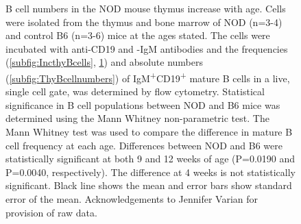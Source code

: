 \begin{figure}
\begin{subfigure}{0.5\textwidth}
	\label{subfig:BMBcells}
	\end{subfigure}
\caption[B cell numbers in the NOD mouse thymus increase with age]{B cell numbers in the NOD mouse thymus increase with age. 
Cells were isolated from the thymus and bone marrow of NOD (n=3-4) and control B6 (n=3-6) mice at the ages stated. The cells were incubated with anti-CD19 and -IgM antibodies and the frequencies (\ref{subfig:IncthyBcells}, \ref{subfig:BMBcells}) and absolute numbers (\ref{subfig:ThyBcellnumbers}) of IgM\textsuperscript{+}CD19\textsuperscript{+} mature B cells in a live, single cell gate, was determined by flow cytometry.
Statistical significance in B cell populations between NOD and B6 mice was determined using the Mann Whitney non-parametric test.
The Mann Whitney test was used to compare the difference in mature B cell frequency at each age. Differences between NOD and B6 were statistically significant at both 9 and 12 weeks of age (P=0.0190 and P=0.0040, respectively). The difference at 4 weeks is not statistically significant. Black line shows the mean and error bars show standard error of the mean.
Acknowledgements to Jennifer Varian for provision of raw data.}
\label{fig:IncthyBcells}
\end{figure}

